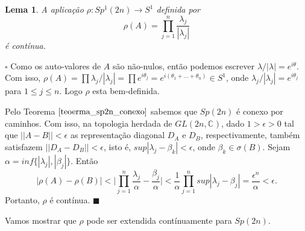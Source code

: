 \documentclass[12pt]{book}
\newtheorem{lema}[teorema]{Lema}
\newenvironment{prova}[1]{$\square$ #1}{\hfill$\blacksquare$}
\newcommand{\circulo}{S^{1}}
\newcommand{\complexo}[1]{\mathbb{C}^{#1}}
\newcommand{\generalgroup}[2]{GL(#1, #2)}
\newcommand{\generalgroupcomplexo}[1]{\generalgroup{#1}{\complexo{}}}
\newcommand{\gruposimpletico}[1]{Sp(#1)}
\newcommand{\gruposimpleticoespecial}[1]{Sp^{1}(#1)}
\newcommand{\norma}[1]{||#1||}
\begin{document}
		\begin{lema}
			A aplicação $\rho:\gruposimpleticoespecial{2n} \to \circulo$ definida por 
			$$
				\rho(A) = \prod_{j=1}^{n}\frac{\lambda_{j}}{|\lambda_{j}|}
			$$
			é contínua.
		\end{lema}
	\begin{prova}
		Como os auto-valores de $A$ são não-nulos, então podemos escrever $\lambda/|\lambda| = e^{i\theta}$. Com isso, $\rho(A)=\prod \lambda_{j}/|\lambda_{j}| = \prod e^{i\theta_{j}} = e^{i(\theta_{1}+\dots +\theta_{n})} \in \circulo$, onde $\lambda_{j}/|\lambda_{j}| = e^{i\theta_{j}}$ para $1\leq j \leq n$. Logo $\rho$ esta bem-definida.
		
		Pelo Teorema $\ref{teoerma_sp2n_conexo}$ sabemos que $\gruposimpletico{2n}$ é conexo por caminhos. Com isso, na topologia herdada de $\generalgroupcomplexo{2n}$, dado $1>\epsilon >0$ tal que $\norma{A-B}< \epsilon$ as representação diagonal $D_{A}$ e $D_{B}$, respectivamente, também satisfazem $\norma{D_{A}-D_{B}}< \epsilon$, isto é, $sup|\lambda_{j}-\beta_{k}| < \epsilon$, onde $\beta_{k} \in \sigma(B)$. Sejam $\alpha = inf \{|\lambda_{j}|,|\beta_{j}|\}$. Então
		$$
		|\rho(A) -\rho(B)| < \Big|\prod_{j=1}^{n} \frac{\lambda_{j}}{\alpha} - \frac{\beta_{j}}{\alpha} \Big| <\frac{1}{\alpha}\prod_{j=1}^{n} sup|\lambda_{j} - \beta_{j}|=\frac{\epsilon^{n}}{\alpha}<\epsilon.
		$$
		Portanto, $\rho$ é contínua.
	\end{prova}		
	
	Vamos mostrar que $\rho$ pode ser extendida contínuamente para $\gruposimpletico{2n}$.
	
\end{document}
